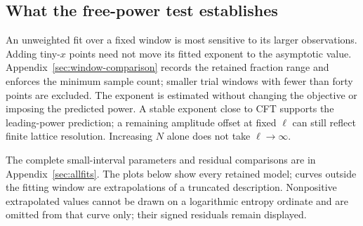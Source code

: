 \subsection{What the free-power test establishes}
An unweighted fit over a fixed window is most sensitive to its larger
observations. Adding tiny-$x$ points need not move its fitted exponent
to the asymptotic value. Appendix~\ref{sec:window-comparison} records
the retained fraction range and enforces the minimum sample count;
smaller trial windows with fewer than forty points are excluded.
The exponent is estimated without changing the objective or imposing
the predicted power. A stable exponent close
to CFT supports the leading-power prediction; a remaining amplitude
offset at fixed $\ell$ can still reflect finite lattice resolution.
Increasing $N$ alone does not take $\ell\to\infty$.

The complete small-interval parameters and residual comparisons are in
Appendix~\ref{sec:allfits}. The plots below show every retained model;
curves outside the fitting window are extrapolations of a truncated
description. Nonpositive extrapolated values cannot be drawn on a
logarithmic entropy ordinate and are omitted from that curve only;
their signed residuals remain displayed.

